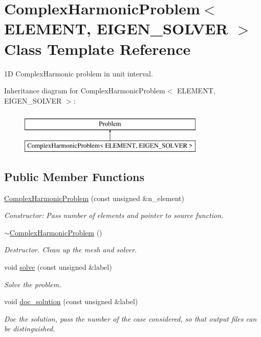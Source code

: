 \hypertarget{classComplexHarmonicProblem}{}\section{Complex\+Harmonic\+Problem$<$ E\+L\+E\+M\+E\+NT, E\+I\+G\+E\+N\+\_\+\+S\+O\+L\+V\+ER $>$ Class Template Reference}
\label{classComplexHarmonicProblem}


1D Complex\+Harmonic problem in unit interval.  


Inheritance diagram for Complex\+Harmonic\+Problem$<$ E\+L\+E\+M\+E\+NT, E\+I\+G\+E\+N\+\_\+\+S\+O\+L\+V\+ER $>$\+:\begin{figure}[H]
\begin{center}
\leavevmode
\includegraphics[height=2.000000cm]{classComplexHarmonicProblem}
\end{center}
\end{figure}
\subsection*{Public Member Functions}
\begin{DoxyCompactItemize}
\item 
\hyperlink{classComplexHarmonicProblem_aaec243aef8d954804e203f5d310b0800}{Complex\+Harmonic\+Problem} (const unsigned \&n\+\_\+element)
\begin{DoxyCompactList}\small\item\em Constructor\+: Pass number of elements and pointer to source function. \end{DoxyCompactList}\item 
\hyperlink{classComplexHarmonicProblem_a2222e80aab2660c62cbf01c5bba842fa}{$\sim$\+Complex\+Harmonic\+Problem} ()
\begin{DoxyCompactList}\small\item\em Destructor. Clean up the mesh and solver. \end{DoxyCompactList}\item 
void \hyperlink{classComplexHarmonicProblem_a3453c3c11a76fbab8c6383b52b6b33d7}{solve} (const unsigned \&label)
\begin{DoxyCompactList}\small\item\em Solve the problem. \end{DoxyCompactList}\item 
void \hyperlink{classComplexHarmonicProblem_a984616c738c9bc14a93ad825a87b0051}{doc\+\_\+solution} (const unsigned \&label)
\begin{DoxyCompactList}\small\item\em Doc the solution, pass the number of the case considered, so that output files can be distinguished. \end{DoxyCompactList}\end{DoxyCompactItemize}


